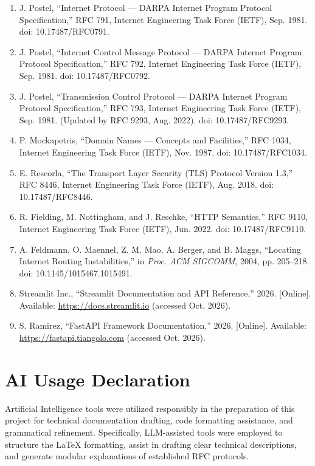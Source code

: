 \documentclass[
]{article}
\providecommand{\tightlist}{%
  \setlength{\itemsep}{0pt}\setlength{\parskip}{0pt}}
\begin{document}
\begin{enumerate}
\tightlist
\item J. Postel, ``Internet Protocol --- DARPA Internet Program Protocol Specification,'' RFC 791, Internet Engineering Task Force (IETF), Sep. 1981. doi: 10.17487/RFC0791.
\item J. Postel, ``Internet Control Message Protocol --- DARPA Internet Program Protocol Specification,'' RFC 792, Internet Engineering Task Force (IETF), Sep. 1981. doi: 10.17487/RFC0792.
\item J. Postel, ``Transmission Control Protocol --- DARPA Internet Program Protocol Specification,'' RFC 793, Internet Engineering Task Force (IETF), Sep. 1981. (Updated by RFC 9293, Aug. 2022). doi: 10.17487/RFC9293.
\item P. Mockapetris, ``Domain Names --- Concepts and Facilities,'' RFC 1034, Internet Engineering Task Force (IETF), Nov. 1987. doi: 10.17487/RFC1034.
\item E. Rescorla, ``The Transport Layer Security (TLS) Protocol Version 1.3,'' RFC 8446, Internet Engineering Task Force (IETF), Aug. 2018. doi: 10.17487/RFC8446.
\item R. Fielding, M. Nottingham, and J. Reschke, ``HTTP Semantics,'' RFC 9110, Internet Engineering Task Force (IETF), Jun. 2022. doi: 10.17487/RFC9110.
\item A. Feldmann, O. Maennel, Z. M. Mao, A. Berger, and B. Maggs, ``Locating Internet Routing Instabilities,'' in \textit{Proc. ACM SIGCOMM}, 2004, pp. 205--218. doi: 10.1145/1015467.1015491.
\item Streamlit Inc., ``Streamlit Documentation and API Reference,'' 2026. [Online]. Available: \url{https://docs.streamlit.io} (accessed Oct. 2026).
\item S. Ramirez, ``FastAPI Framework Documentation,'' 2026. [Online]. Available: \url{https://fastapi.tiangolo.com} (accessed Oct. 2026).
\end{enumerate}

\newpage

\section{AI Usage Declaration}\label{ai-usage-declaration}

Artificial Intelligence tools were utilized responsibly in the preparation of this project for technical documentation drafting, code formatting assistance, and grammatical refinement. Specifically, LLM-assisted tools were employed to structure the LaTeX formatting, assist in drafting clear technical descriptions, and generate modular explanations of established RFC protocols. 
\end{document}
